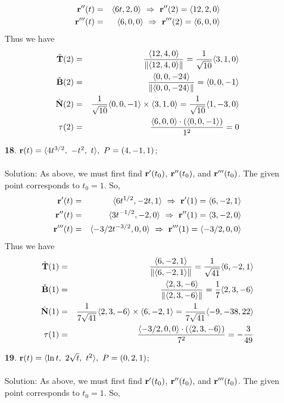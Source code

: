 \documentclass[12pt]{amsbook}
\newcommand{\la}{\langle}
\newcommand{\ra}{\rangle}
\begin{document}
\begin{enumerate}
\begin{eqnarray*}
  {\bf r}''(t)&=&\la 6t,2,0 \ra \ \Rightarrow \ {\bf r}''(2)=\la 12,2,0 \ra \\
  {\bf r}'''(t)&=&\la 6,0,0 \ra  \ \Rightarrow \ {\bf r}'''(2)=\la 6,0,0 \ra
  \end{eqnarray*}
  Thus we have
  \begin{eqnarray*}
  \hat{\bf T}(2)&=&\frac{\la 12,4,0 \ra}{\|\la 12,4,0 \ra\|}=\frac{1}{\sqrt{10}}\la 3,1,0 \ra \\
  \hat{\bf B}(2)&=&\frac{\la 0,0,-24 \ra}{\|\la 0,0,-24 \ra\|}= \la 0,0,-1 \ra \\
  \hat{\bf N}(2)&=&\frac{1}{\sqrt{10}} \la 0,0,-1 \ra\times\la 3,1,0 \ra=\frac{1}{\sqrt{10}}\la 1,-3,0 \ra \\
  \tau(2)&=&\frac{\la 6,0,0 \ra\cdot(\la 0,0,-1 \ra)}{1^2}=0
  \end{eqnarray*} 
  \item[{\small\bf 18}.] ${\bf r}(t)=\la 4t^{3/2},\ -t^2,\ t\ra, \ P=(4,-1,1)$;
  \\
  \\
  {\sc Solution}: As above, we must first find ${\bf r}'(t_0)$, ${\bf r}''(t_0)$, and ${\bf r}'''(t_0)$. The given point corresponds to $t_0=1$. So,
  \begin{eqnarray*}
  {\bf r}'(t)&=&\la 6t^{1/2},-2t,1 \ra \ \Rightarrow \ {\bf r}'(1)=\la 6,-2,1 \ra \\
  {\bf r}''(t)&=&\la 3t^{-1/2},-2,0 \ra \ \Rightarrow \ {\bf r}''(1)=\la 3,-2,0 \ra \\
  {\bf r}'''(t)&=&\la -3/2t^{-3/2},0,0 \ra  \ \Rightarrow \ {\bf r}'''(1)=\la -3/2,0,0 \ra
  \end{eqnarray*}
  Thus we have
  \begin{eqnarray*}
  \hat{\bf T}(1)&=&\frac{\la 6,-2,1 \ra}{\|\la 6,-2,1 \ra\|}=\frac{1}{\sqrt{41}}\la 6,-2,1 \ra \\
  \hat{\bf B}(1)&=&\frac{\la 2,3,-6 \ra}{\|\la 2,3,-6 \ra\|}= \frac{1}{7}\la 2,3,-6 \ra \\
  \hat{\bf N}(1)&=&\frac{1}{7\sqrt{41}} \la 2,3,-6 \ra\times\la 6,-2,1 \ra=\frac{1}{7\sqrt{41}}\la -9,-38,22 \ra \\
  \tau(1)&=&\frac{\la -3/2,0,0 \ra\cdot(\la 2,3,-6 \ra)}{7^2}=-\frac{3}{49}
  \end{eqnarray*} 
  \item[{\small\bf 19}.] ${\bf r}(t)=\la \ln t,\ 2\sqrt{t},\ t^2\ra, \ P=(0,2,1)$;
  \\
  \\
  {\sc Solution}: As above, we must first find ${\bf r}'(t_0)$, ${\bf r}''(t_0)$, and ${\bf r}'''(t_0)$. The given point corresponds to $t_0=1$. So,

\end{enumerate}
\end{document}

